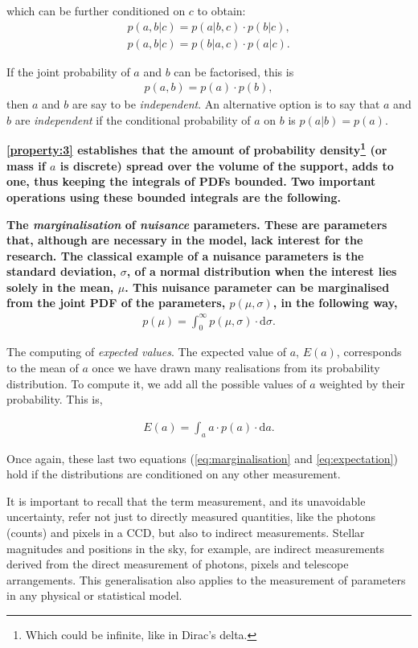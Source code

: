 which can be further conditioned on $c$ to obtain:
\begin{align}
\label{eq:conditioned}
p(a,b|c)=p(a|b,c)\cdot p(b|c),\nonumber \\
p(a,b|c)=p(b|a,c) \cdot p(a|c).
\end{align}

If the joint probability of $a$ and $b$ can be factorised, this is
\begin{align}
p(a,b)=p(a)\cdot p(b),
\end{align}
then $a$ and $b$ are say to be \emph{independent}. An alternative option is to say that $a$ and $b$ are \emph{independent} if the conditional probability of $a$ on $b$ is $p(a|b)=p(a)$.

\textbf{
\ref{property:3} establishes that the amount of probability density\footnote{Which could be infinite, like in Dirac's delta.} (or mass if $a$ is discrete) spread over the volume of the support, adds to one, thus keeping the integrals of PDFs bounded. Two important operations using these bounded integrals are the following.
}

\textbf{
The \emph{marginalisation} of \emph{nuisance} parameters. These are parameters that, although are necessary in the model, lack interest for the research. The classical example of a nuisance parameters is the standard deviation, $\sigma$, of a normal distribution when the interest lies solely in the mean, $\mu$. This nuisance parameter can be marginalised from the joint PDF of the parameters, $p(\mu,\sigma)$, in the following way,
}
\begin{align}
\label{eq:marginalisation}
p(\mu)=\int_0^{\infty} p(\mu,\sigma)\cdot \mathrm{d}\sigma.
\end{align}

The computing of \emph{expected values}. The expected value of $a$, $E(a)$, corresponds to the mean of $a$ once we have drawn many realisations from its probability distribution. To compute it, we add all the possible values of $a$ weighted by their probability. This is,

\begin{align}
\label{eq:expectation}
E(a)=\int_a a\cdot p(a)\cdot \mathrm{d}a.
\end{align}

Once again, these last two equations (\ref{eq:marginalisation} and \ref{eq:expectation}) hold if the distributions are conditioned on any other measurement.

It is important to recall that the term measurement, and its unavoidable uncertainty, refer not just to directly measured quantities, like the photons (counts) and pixels in a CCD, but also to indirect measurements. Stellar magnitudes and positions in the sky, for example, are indirect measurements derived from the direct measurement of photons, pixels and telescope arrangements. This generalisation also applies to the measurement of parameters in any physical or statistical model.%


